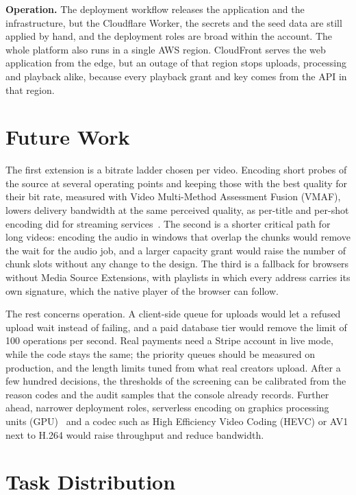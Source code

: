 \textbf{Operation.} The deployment workflow releases the application and the infrastructure, but the
Cloudflare Worker, the secrets and the seed data are still applied by hand, and the deployment roles
are broad within the account. The whole platform also runs in a single AWS region. CloudFront serves the
web application from the edge, but an outage of that region stops uploads, processing and playback
alike, because every playback grant and key comes from the API in that region.

\section{Future Work}
\label{sec:future-work}

The first extension is a bitrate ladder chosen per video. Encoding short probes of the source at
several operating points and keeping those with the best quality for their bit rate, measured with
Video Multi-Method Assessment Fusion (VMAF), lowers delivery bandwidth at the same perceived quality,
as per-title and per-shot encoding did for streaming services~\cite{netflix2015pertitle,netflix2018dynamic}.
The second is a shorter critical path for long videos: encoding the audio in windows that overlap the
chunks would remove the wait for the audio job, and a larger capacity grant would raise the number of
chunk slots without any change to the design. The third is a fallback for browsers without Media
Source Extensions, with playlists in which every address carries its own signature, which the native
player of the browser can follow.

The rest concerns operation. A client-side queue for uploads would let a refused upload wait
instead of failing, and a paid database tier would remove the limit of 100 operations per second.
Real payments need a Stripe account in live mode, while the code stays the same; the priority queues
should be measured on production, and the length limits tuned from what real creators upload. After a
few hundred decisions, the thresholds of the screening can be calibrated from the reason codes and the
audit samples that the console already records. Further ahead, narrower deployment roles, serverless
encoding on graphics processing units (GPU)~\cite{gpuserverless2024} and a codec such as High
Efficiency Video Coding (HEVC) or AV1 next to H.264 would raise throughput and reduce bandwidth.

\section{Task Distribution}
\label{sec:task-distribution}

